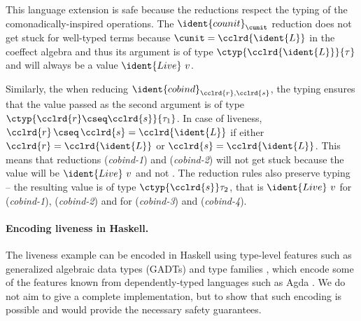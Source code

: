 %
This language extension is safe because the reductions respect the typing of the
comonadically-inspired operations. The $\ident{counit}_\cunit$ reduction does not get stuck
for well-typed terms because $\cunit = \cclrd{\ident{L}}$ in the coeffect algebra and thus its
argument is of type $\ctyp{\cclrd{\ident{L}}}{\tau}$ and will always be a value $\ident{Live}~v$.

Similarly, the when reducing $\ident{cobind}_{\cclrd{r}, \cclrd{s}}$, the typing ensures that
the value passed as the second argument is of type $\ctyp{\cclrd{r}\cseq\cclrd{s}}{\tau_1}$.
In case of liveness, $\cclrd{r}\,\cseq\,\cclrd{s}=\cclrd{\ident{L}}$ if either
$\cclrd{r}=\cclrd{\ident{L}}$ or $\cclrd{s}=\cclrd{\ident{L}}$. This means that reductions
(\emph{cobind-1}) and (\emph{cobind-2}) will not get stuck because the value will be
$\ident{Live}~v$ and not . The reduction rules also preserve typing -- the resulting
value is of type $\ctyp{\cclrd{s}}\tau_2$, that is $\ident{Live}~v$ for (\emph{cobind-1}),
(\emph{cobind-2}) and  for (\emph{cobind-3}) and (\emph{cobind-4}).


\paragraph{Encoding liveness in Haskell.}
The liveness example can be encoded in Haskell using type-level features such as generalized
algebraic data types (GADTs) and type families \cite{haskell-faking,haskell-promotion,haskell-families},
which encode some of the features known from dependently-typed languages such as Agda \cite{other-agda}.
We do not aim to give a complete implementation, but to show that such encoding is possible and
would provide the necessary safety guarantees.

